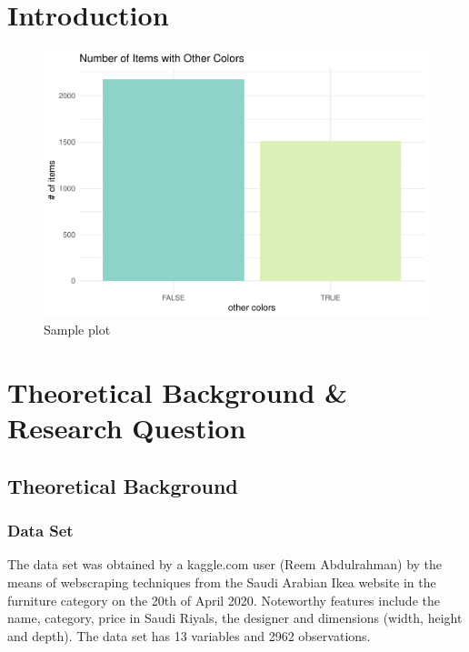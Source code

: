 \documentclass[a4paper, nobind]{templates/ociamthesis}
\begin{document}
\flushbottom

\hypertarget{intro}{%
\chapter{Introduction}\label{intro}}

\begin{figure}
\includegraphics[width=1\linewidth]{_main_files/figure-latex/unnamed-chunk-3-1} \caption{Sample plot}\label{fig:unnamed-chunk-3}
\end{figure}

\hypertarget{theoretical-background-research-question}{%
\chapter{Theoretical Background \& Research Question}\label{theoretical-background-research-question}}

\hypertarget{theoretical_background}{%
\section{Theoretical Background}\label{theoretical_background}}

\hypertarget{data-set}{%
\subsection{Data Set}\label{data-set}}

The data set was obtained by a kaggle.com user (Reem Abdulrahman) by the means of webscraping techniques from the Saudi Arabian Ikea website in the furniture category on the 20th of April 2020. Noteworthy features include the name, category, price in Saudi Riyals, the designer and dimensions (width, height and depth). The data set has 13 variables and 2962 observations.
\end{document}
